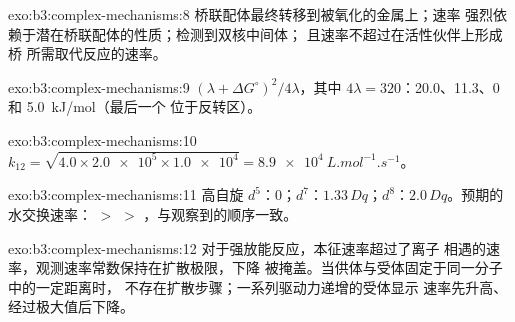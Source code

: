 \begin{solution}{exo:b3:complex-mechanisms:8}
桥联配体最终转移到被氧化的金属上；速率
强烈依赖于潜在桥联配体的性质；检测到双核中间体；
且速率不超过在活性伙伴上形成桥
所需取代反应的速率。
\end{solution}

\begin{solution}{exo:b3:complex-mechanisms:9}
$(\lambda + \Delta G^\circ)^2/4\lambda$，其中 $4\lambda = 320$：20.0、11.3、0 和 \qty{5.0}{kJ/mol}（最后一个
位于反转区）。
\end{solution}

\begin{solution}{exo:b3:complex-mechanisms:10}
$k_{12} = \sqrt{4.0 \times \num{2.0e5} \times \num{1.0e4}} = \qty{8.9e4}{L.mol^{-1}.s^{-1}}$。
\end{solution}

\begin{solution}{exo:b3:complex-mechanisms:11}
高自旋 $d^5$：0；$d^7$：$1.33\,Dq$；$d^8$：$2.0\,Dq$。预期的水交换速率： $>$  $>$
，与观察到的顺序一致。
\end{solution}

\begin{solution}{exo:b3:complex-mechanisms:12}
对于强放能反应，本征速率超过了离子
相遇的速率，观测速率常数保持在扩散极限，下降
被掩盖。当供体与受体固定于同一分子中的一定距离时，
不存在扩散步骤；一系列驱动力递增的受体显示
速率先升高、经过极大值后下降。
\end{solution}

